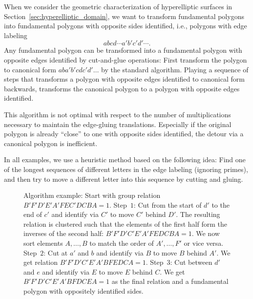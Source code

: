\documentclass[Thesis]{subfiles}
\begin{document}

When we consider the geometric characterization of hyperelliptic
surfaces in Section~\ref{sec:hyperelliptic_domain}, we want to
transform fundamental polygons into fundamental polygons with opposite
sides identified, i.e., polygons with edge labeling 
\begin{equation*}
abcd\cdots a'b'c'd'\cdots.
\end{equation*}
Any fundamental polygon can be transformed into a fundamental polygon
with opposite edges identified by cut-and-glue operations: First
transform the polygon to canonical form $aba'b'cdc'd'\ldots$ by the
standard algorithm. Playing a sequence of steps that transforms
a polygon with opposite edges identified to canonical form backwards,
transforms the canonical polygon to a polygon with opposite edges
identified.

This algorithm is not optimal with respect to the number of
multiplications necessary to maintain the edge-gluing
translations. Especially if the original polygon is already ``close''
to one with opposite sides identified, the detour via a canonical
polygon is inefficient.  

In all examples, we use a heuristic method based on the following
idea: Find one of the longest sequences of different letters in the edge
labeling (ignoring primes), and then try to move a different letter
into this sequence by cutting and gluing.

 \begin{figure}
 \caption{Algorithm example: Start with group relation $B'F'D'E'A'FEC'DCBA = 1$. Step~$1$: Cut from the start of $d'$ to the end of $c'$ and identify via $C'$ to move $C'$ behind $D'$. The resulting relation is clustered such that the elements of the first half form the inverses of the second half: $B'F'D'C'E'A'FEDCBA= 1$. We now sort elements $A,\ldots,B$ to match the order of $A',\ldots,F'$ or vice versa. Step~$2$: Cut at $a'$ and $b$ and identify via $B$ to move $B$ behind $A'$. We get relation $B'F'D'C'E'A'BFEDCA = 1$. Step~$3$: Cut between $d'$ and $e$ and identify via $E$ to move $E$ behind $C$. We get $B'F'D'C'E'A'BFDCEA = 1$ as the final relation and a fundamental polygon with oppositely identified sides.}
 \label{fig:opposite_algorithm}
 \end{figure}
\end{document}
